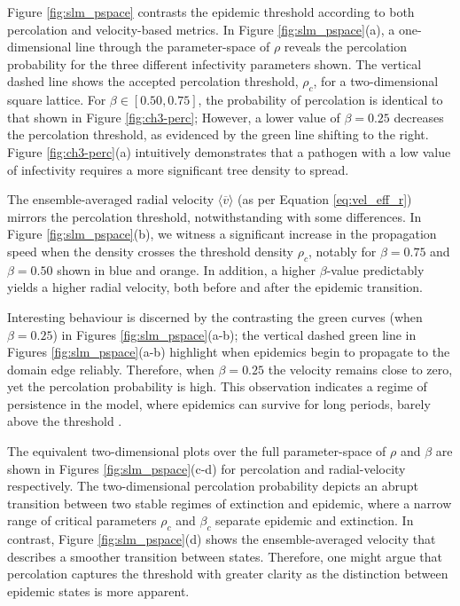 Figure \ref{fig:slm_pspace} contrasts the epidemic threshold according to both percolation and velocity-based metrics.
In Figure \ref{fig:slm_pspace}(a), a one-dimensional line through the parameter-space of $\rho$ reveals the percolation probability for the three different infectivity parameters shown.
The vertical dashed line shows the accepted percolation threshold, $\rho_c$, for a two-dimensional square lattice. 
For $\beta \in [0.50, 0.75]$, the probability of percolation is identical to that shown in Figure \ref{fig:ch3-perc};
However, a lower value of $\beta = 0.25$ decreases the percolation threshold, as evidenced by the green line shifting to the right.
Figure \ref{fig:ch3-perc}(a) intuitively demonstrates that a pathogen with a low value of infectivity requires a more significant tree density to spread.

The ensemble-averaged radial velocity $\big\langle \overline{v} \big\rangle$ (as per Equation \ref{eq:vel_eff_r}) mirrors the percolation threshold,
notwithstanding with some differences.
In Figure \ref{fig:slm_pspace}(b), we witness a significant increase in the propagation speed when the density crosses the threshold density $\rho_c$, 
notably for $\beta=0.75$ and $\beta=0.50$ shown in blue and orange. 
In addition, a higher $\beta$-value predictably yields a higher radial velocity, both before and after the epidemic transition.

Interesting behaviour is discerned by the contrasting the green curves (when $\beta=0.25$) in Figures \ref{fig:slm_pspace}(a-b);
the vertical dashed green line in Figures \ref{fig:slm_pspace}(a-b) highlight when epidemics begin to propagate to the domain edge reliably.
Therefore, when $\beta=0.25$ the velocity remains close to zero, yet the percolation probability is high. 
This observation indicates a regime of persistence in the model, where epidemics can survive for long periods, barely above the threshold \cite{gilligan2008epidemiological}.

The equivalent two-dimensional plots over the full parameter-space of $\rho$ and $\beta$ are shown in Figures \ref{fig:slm_pspace}(c-d) for percolation and radial-velocity respectively. 
The two-dimensional percolation probability depicts an abrupt transition between two stable regimes of extinction and epidemic, where
a narrow range of critical parameters $\rho_c$ and $\beta_c$ separate epidemic and extinction.
In contrast, Figure \ref{fig:slm_pspace}(d) shows the ensemble-averaged velocity that describes a smoother transition between states.
Therefore, one might argue that percolation captures the threshold with greater clarity as the distinction between epidemic states is more apparent.

